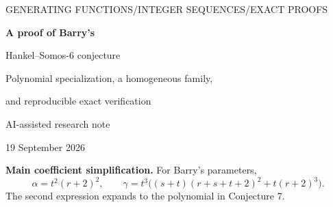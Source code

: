 \documentclass[11pt,a4paper]{article}
\numberwithin{equation}{section}
\theoremstyle{definition}
\begin{document}
\thispagestyle{empty}
\begin{center}
{\small\sffamily\color{accent}GENERATING FUNCTIONS\quad /\quad INTEGER SEQUENCES\quad /\quad EXACT PROOFS}\par
\vspace{1.1cm}
{\LARGE\bfseries\color{ink}A proof of Barry's\par Hankel--Somos-6 conjecture}\par
\vspace{0.45cm}
{\large Polynomial specialization, a homogeneous family,\par and reproducible exact verification}\par
\vspace{0.7cm}
{AI-assisted research note}\par
{19 September 2026}
\end{center}
\vspace{0.7cm}
\begin{abstract}
Conjecture 7 of Paul Barry's 2022 paper proposes a three-parameter family of
quadratic algebraic generating functions whose Hankel determinants satisfy a
Somos-6 recurrence with its middle coefficient zero. We prove the claimed
bilinear identity and its homogeneous four-parameter form. The decisive
observation is a constant square completion: the apparent cubic remainder in
the associated sextic discriminant becomes linear. This identifies the
recurrence coefficients with the invariants in van der Poorten's 2005
continued-fraction theorem. We give an algebraic derivation of the needed
local identity and the Hankel correspondence.

A genuine technical issue is that the original family has an exceptional
initial complete quotient, and some parameter values produce zero Hankel
determinants. We handle both by embedding the family in a polynomial
seven-parameter deformation. An explicit Catalan specialization proves that
all its generic Hankel determinants are nonzero. The resulting identity is
then specialized without division. Consequently the final statement holds
over every commutative coefficient ring, including at singular parameters.
The accompanying programs independently compute determinants and verify
10,248 recurrence residuals in 1,128 test cases, with additional example and
symbolic checks.
\end{abstract}
\vspace{0.4cm}
\begin{tcolorbox}[colback=pale,colframe=accent,boxrule=0.6pt,arc=1mm]
\textbf{Main coefficient simplification.} For Barry's parameters,
\[
 \alpha=t^2(r+2)^2,\qquad
 \gamma=t^3\bigl((s+t)(r+s+t+2)^2+t(r+2)^3\bigr).
\]
The second expression expands to the polynomial in Conjecture 7.
\end{tcolorbox}
\end{document}
